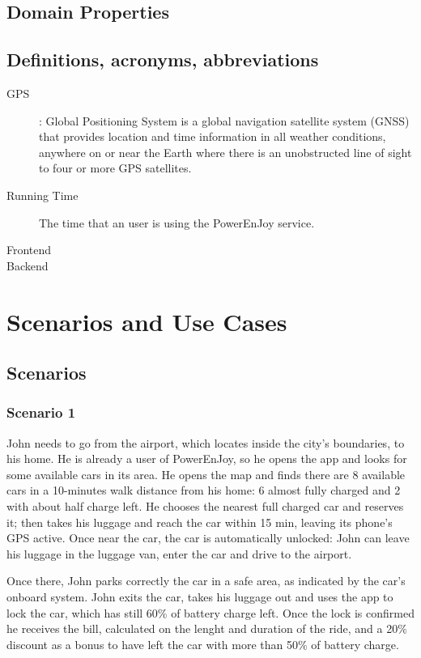 \documentclass[11pt]{article} %
\newcommand{\pe}{PowerEnJoy }
\newcommand{\pecomma}{PowerEnJoy, }
\begin{document}
\subsection{Domain Properties}

\subsection{Definitions,  acronyms,  abbreviations}
  	
  \begin{description}
  	\item[GPS]: Global Positioning System is a global navigation satellite system (GNSS) that provides location and time information in all weather conditions, anywhere on or near the Earth where there is an unobstructed line of sight to four or more GPS satellites.
  	\item[Running Time] The time that an user is using the \pe service.
  	\item[Frontend]
  	\item[Backend]
  \end{description}
  

\newpage
\section{Scenarios and Use Cases}

\subsection{Scenarios}

\subsubsection{Scenario 1}
John needs to go from the airport, which locates inside the city's boundaries, to his home. He is already a user of \pecomma so he opens the app and looks for some available cars in its area. He opens the map and finds there are 8 available cars in a 10-minutes walk distance from his home: 6 almost fully charged and 2 with about half charge left. He chooses the nearest full charged car and reserves it; then takes his luggage and reach the car within 15 min, leaving its phone's GPS active. Once near the car, the car is automatically unlocked: John can leave his luggage in the luggage van, enter the car and drive to the airport.

Once there, John parks correctly the car in a safe area, as indicated by the car's onboard system. John exits the car, takes his luggage out and uses the app to lock the car, which has still 60\% of battery charge left. Once the lock is confirmed he receives the bill, calculated on the lenght and duration of the ride, and a 20\% discount as a bonus to have left the car with more than 50\% of battery charge.
\end{document}
